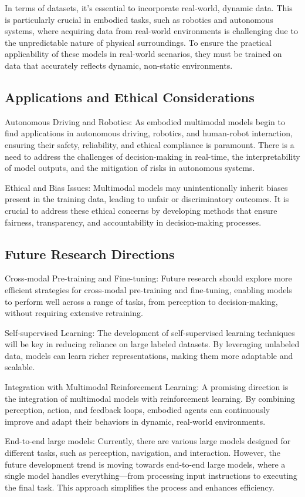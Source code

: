 In terms of datasets, it's essential to incorporate real-world, dynamic data. This is particularly crucial in embodied tasks, such as robotics and autonomous systems, where acquiring data from real-world environments is challenging due to the unpredictable nature of physical surroundings. To ensure the practical applicability of these models in real-world scenarios, they must be trained on data that accurately reflects dynamic, non-static environments.

\subsection{Applications and Ethical Considerations}
Autonomous Driving and Robotics: As embodied multimodal models begin to find applications in autonomous driving, robotics, and human-robot interaction, ensuring their safety, reliability, and ethical compliance is paramount. There is a need to address the challenges of decision-making in real-time, the interpretability of model outputs, and the mitigation of risks in autonomous systems.

Ethical and Bias Issues: Multimodal models may unintentionally inherit biases present in the training data, leading to unfair or discriminatory outcomes. It is crucial to address these ethical concerns by developing methods that ensure fairness, transparency, and accountability in decision-making processes.

\subsection{Future Research Directions}
Cross-modal Pre-training and Fine-tuning: Future research should explore more efficient strategies for cross-modal pre-training and fine-tuning, enabling models to perform well across a range of tasks, from perception to decision-making, without requiring extensive retraining.

Self-supervised Learning: The development of self-supervised learning techniques will be key in reducing reliance on large labeled datasets. By leveraging unlabeled data, models can learn richer representations, making them more adaptable and scalable.

Integration with Multimodal Reinforcement Learning: A promising direction is the integration of multimodal models with reinforcement learning. By combining perception, action, and feedback loops, embodied agents can continuously improve and adapt their behaviors in dynamic, real-world environments.

End-to-end large models: Currently, there are various large models designed for different tasks, such as perception, navigation, and interaction. However, the future development trend is moving towards end-to-end large models, where a single model handles everything—from processing input instructions to executing the final task. This approach simplifies the process and enhances efficiency.

